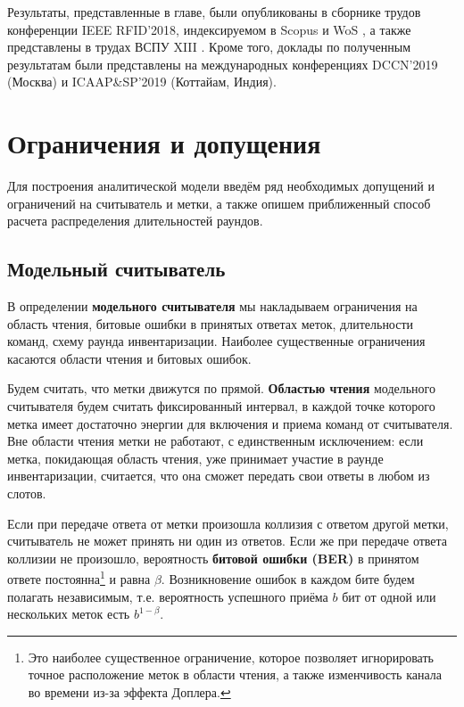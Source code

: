 Результаты, представленные в главе, были опубликованы в сборнике трудов конференции IEEE RFID'2018, индексируемом в Scopus и WoS \cite{RFID_IEEERFID2018}, а также представлены в трудах ВСПУ XIII \cite{RFID_VSPU2019}. Кроме того, доклады по полученным результатам были представлены на международных конференциях DCCN'2019 (Москва) и ICAAP\&SP'2019 (Коттайам, Индия).





\section{Ограничения и допущения}\label{sec:ch3_assumptions}
Для построения аналитической модели введём ряд необходимых допущений и ограничений на считыватель и метки, а также опишем приближенный способ расчета распределения длительностей раундов.


\subsection{Модельный считыватель}
В определении \textbf{модельного считывателя} мы накладываем ограничения на область чтения, битовые ошибки в принятых ответах меток, длительности команд, схему раунда инвентаризации. Наиболее существенные ограничения касаются области чтения и битовых ошибок.

Будем считать, что метки движутся по прямой. \textbf{Областью чтения} модельного считывателя будем считать фиксированный интервал, в каждой точке которого метка имеет достаточно энергии для включения и приема команд от считывателя. Вне области чтения метки не работают, с единственным исключением: если метка, покидающая область чтения, уже принимает участие в раунде инвентаризации, считается, что она сможет передать свои ответы в любом из слотов.

Если при передаче ответа от метки произошла коллизия с ответом другой метки, считыватель не может принять ни один из ответов. Если же при передаче ответа коллизии не произошло, вероятность \textbf{битовой ошибки (BER)} в принятом ответе постоянна\footnote{Это наиболее существенное ограничение, которое позволяет игнорировать точное расположение меток в области чтения, а также изменчивость канала во времени из-за эффекта Доплера.} и равна $\beta$. Возникновение ошибок в каждом бите будем полагать независимым, т.е. вероятность успешного приёма $b$ бит от одной или нескольких меток есть $b^{1 - \beta}$.

